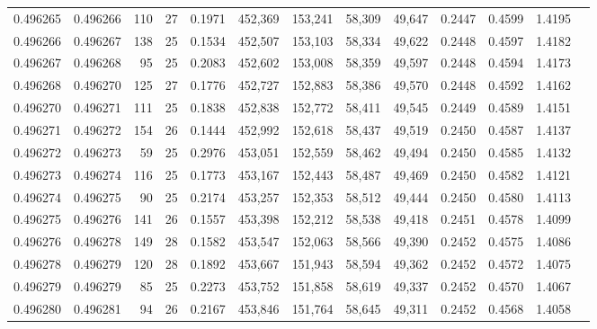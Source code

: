 \begin{tabular}{rrrrrrrrrrrrr}
0.496265 & 0.496266 & 110 &  27 &                                     0.1971 & 452,369 & 153,241 &  58,309 &  49,647 & 0.2447 & 0.4599 & 1.4195 \\
0.496266 & 0.496267 & 138 &  25 &                                     0.1534 & 452,507 & 153,103 &  58,334 &  49,622 & 0.2448 & 0.4597 & 1.4182 \\
0.496267 & 0.496268 &  95 &  25 &                                     0.2083 & 452,602 & 153,008 &  58,359 &  49,597 & 0.2448 & 0.4594 & 1.4173 \\
0.496268 & 0.496270 & 125 &  27 &                                     0.1776 & 452,727 & 152,883 &  58,386 &  49,570 & 0.2448 & 0.4592 & 1.4162 \\
0.496270 & 0.496271 & 111 &  25 &                                     0.1838 & 452,838 & 152,772 &  58,411 &  49,545 & 0.2449 & 0.4589 & 1.4151 \\
0.496271 & 0.496272 & 154 &  26 &                                     0.1444 & 452,992 & 152,618 &  58,437 &  49,519 & 0.2450 & 0.4587 & 1.4137 \\
0.496272 & 0.496273 &  59 &  25 &                                     0.2976 & 453,051 & 152,559 &  58,462 &  49,494 & 0.2450 & 0.4585 & 1.4132 \\
0.496273 & 0.496274 & 116 &  25 &                                     0.1773 & 453,167 & 152,443 &  58,487 &  49,469 & 0.2450 & 0.4582 & 1.4121 \\
0.496274 & 0.496275 &  90 &  25 &                                     0.2174 & 453,257 & 152,353 &  58,512 &  49,444 & 0.2450 & 0.4580 & 1.4113 \\
0.496275 & 0.496276 & 141 &  26 &                                     0.1557 & 453,398 & 152,212 &  58,538 &  49,418 & 0.2451 & 0.4578 & 1.4099 \\
0.496276 & 0.496278 & 149 &  28 &                                     0.1582 & 453,547 & 152,063 &  58,566 &  49,390 & 0.2452 & 0.4575 & 1.4086 \\
0.496278 & 0.496279 & 120 &  28 &                                     0.1892 & 453,667 & 151,943 &  58,594 &  49,362 & 0.2452 & 0.4572 & 1.4075 \\
0.496279 & 0.496279 &  85 &  25 &                                     0.2273 & 453,752 & 151,858 &  58,619 &  49,337 & 0.2452 & 0.4570 & 1.4067 \\
0.496280 & 0.496281 &  94 &  26 &                                     0.2167 & 453,846 & 151,764 &  58,645 &  49,311 & 0.2452 & 0.4568 & 1.4058 \\

\end{tabular}
